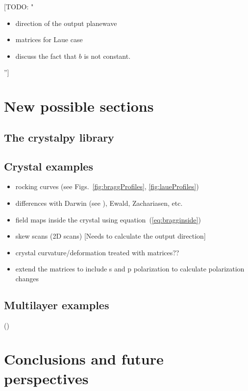 \documentclass{iucr}
\newcommand{\todo}[1]{{\color{red}[TODO: "#1'']}}
\newcommand{\inred}[1]{{\color{red}#1}}
\begin{document}
\newpage
\todo{
\begin{itemize}
    \item direction of the output planewave
    \item matrices for Laue case
    \item discuss the fact that $b$ is not constant.
\end{itemize}
}

%
\inred{
\section{New possible sections}
\subsection{The crystalpy library}
\subsection{Crystal examples}
\begin{itemize}
    \item rocking curves (see Figs.~\ref{fig:braggProfiles}, \ref{fig:laueProfiles})
    \item differences with Darwin (see \cite{Yashiro2000, Yashiro2001}), Ewald, Zachariasen, etc. 
    \item field maps inside the crystal using equation~(\ref{eq:bragginside})
    \item skew scans (2D scans) [Needs to calculate the output direction]
    \item crystal curvature/deformation treated with matrices??
    \item extend the matrices to include s and p polarization to calculate polarization changes
\end{itemize}

\subsection{Multilayer examples }
(\cite{Osterhoff2012, Osterhoff2013})
\section{Conclusions and future perspectives}
\label{sec:summary}

}

\end{document}
